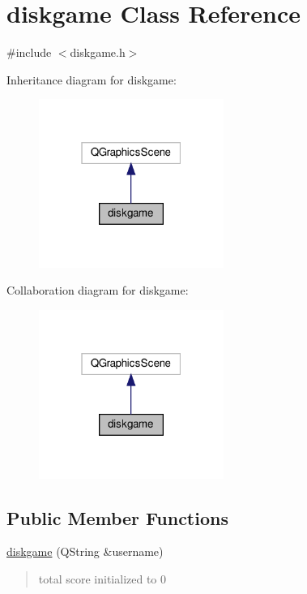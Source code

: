 \hypertarget{classdiskgame}{}\section{diskgame Class Reference}
\label{classdiskgame}


{\ttfamily \#include $<$diskgame.\+h$>$}



Inheritance diagram for diskgame\+:
\nopagebreak
\begin{figure}[H]
\begin{center}
\leavevmode
\includegraphics[width=171pt]{classdiskgame__inherit__graph}
\end{center}
\end{figure}


Collaboration diagram for diskgame\+:
\nopagebreak
\begin{figure}[H]
\begin{center}
\leavevmode
\includegraphics[width=171pt]{classdiskgame__coll__graph}
\end{center}
\end{figure}
\subsection*{Public Member Functions}
\begin{DoxyCompactItemize}
\item 
\hyperlink{classdiskgame_a2cfbe0d32817697867faf096d5770a0d}{diskgame} (Q\+String \&username)
\begin{DoxyCompactList}\small\item\em \begin{quote}
total score initialized to 0 \end{quote}
\end{DoxyCompactList}\end{DoxyCompactItemize}
